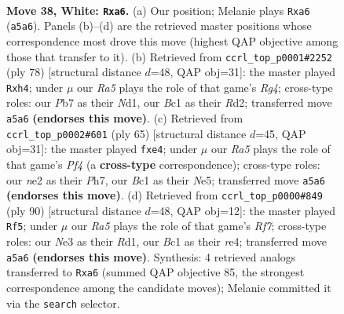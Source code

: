 \documentclass[11pt]{article}
\begin{document}
\clearpage

\begin{figure}[p]\centering
\begin{subfigure}{0.46\textwidth}\centering
\resizebox{\linewidth}{!}{%
\newchessgame
\chessboard[
  setfen={1r5k/1P4b1/n7/R7/2P5/4N3/4n2K/1RB5 w - - 3 38},
  showmover=false,
  pgfstyle=straightmove, color=movearrow, markmove={a5-a6}
]}
\caption{}
\end{subfigure}\hfill
\begin{subfigure}{0.46\textwidth}\centering
\resizebox{\linewidth}{!}{%
\newchessgame
\chessboard[
  setfen={8/p3kp2/8/8/1P4Rb/P3r3/3R4/2rN2K1 w - - 0 40},
  showmover=false,
  pgfstyle=straightmove, color=movearrow, markmove={g4-h4}
]}
\caption{}
\end{subfigure}
\\[4pt]
\begin{subfigure}{0.46\textwidth}\centering
\resizebox{\linewidth}{!}{%
\newchessgame
\chessboard[
  setfen={r4k2/7p/4B3/p3np2/4N2P/R7/1P1K4/8 b - - 0 33},
  showmover=false,
  pgfstyle=straightmove, color=movearrow, markmove={f5-e4}
]}
\caption{}
\end{subfigure}\hfill
\begin{subfigure}{0.46\textwidth}\centering
\resizebox{\linewidth}{!}{%
\newchessgame
\chessboard[
  setfen={8/5Rrk/pB6/P3b3/4r3/8/7P/3R3K w - - 7 46},
  showmover=false,
  pgfstyle=straightmove, color=movearrow, markmove={f7-f5}
]}
\caption{}
\end{subfigure}
\caption{\textbf{Move 38, White: \texttt{Rxa6}.} (a) Our position; Melanie plays \texttt{Rxa6} (\texttt{a5a6}). Panels (b)--(d) are the retrieved master positions whose correspondence most drove this move (highest QAP objective among those that transfer to it). (b) Retrieved from \texttt{ccrl\_top\_p0001\#2252} (ply 78) [structural distance $d$=48, QAP obj=31]: the master played \texttt{Rxh4}; under $\mu$ our \emph{Ra5} plays the role of that game's \emph{Rg4}; cross-type roles: our \emph{P}b7 as their \emph{N}d1, our \emph{B}c1 as their \emph{R}d2; transferred move \texttt{a5a6} \textbf{(endorses this move)}. (c) Retrieved from \texttt{ccrl\_top\_p0002\#601} (ply 65) [structural distance $d$=45, QAP obj=31]: the master played \texttt{fxe4}; under $\mu$ our \emph{Ra5} plays the role of that game's \emph{Pf4} (a \textbf{cross-type} correspondence); cross-type roles: our \emph{n}e2 as their \emph{P}h7, our \emph{B}c1 as their \emph{N}e5; transferred move \texttt{a5a6} \textbf{(endorses this move)}. (d) Retrieved from \texttt{ccrl\_top\_p0000\#849} (ply 90) [structural distance $d$=48, QAP obj=12]: the master played \texttt{Rf5}; under $\mu$ our \emph{Ra5} plays the role of that game's \emph{Rf7}; cross-type roles: our \emph{N}e3 as their \emph{R}d1, our \emph{B}c1 as their \emph{r}e4; transferred move \texttt{a5a6} \textbf{(endorses this move)}. Synthesis: 4 retrieved analogs transferred to \texttt{Rxa6} (summed QAP objective 85, the strongest correspondence among the candidate moves); Melanie committed it via the \texttt{search} selector.}
\label{fig:thought-m74}
\end{figure}
\end{document}
